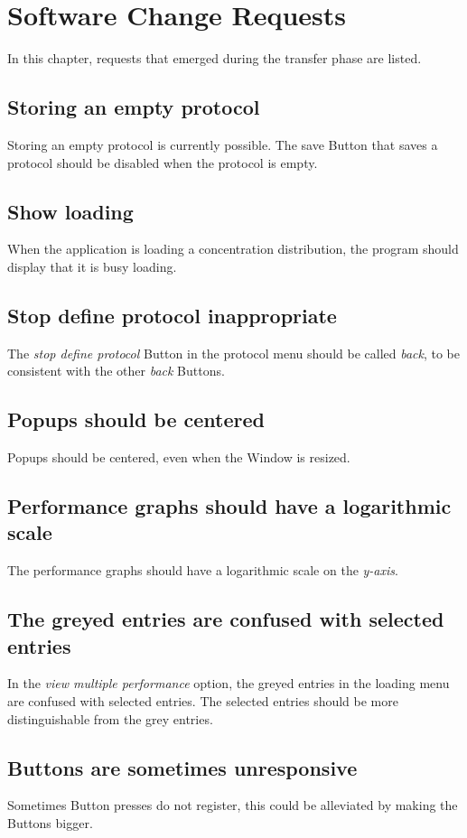 \chapter{Software Change Requests}
\label{chap:changes}

In this chapter, requests that emerged during the transfer phase are listed.

\section*{Storing an empty protocol}
Storing an empty protocol is currently possible. The save Button that saves a protocol should be disabled when the protocol is empty.

\section*{Show loading}
When the application is loading a concentration distribution, the program should display that it is busy loading.

\section*{Stop define protocol inappropriate}
The \emph{stop define protocol} Button in the protocol menu should be called \emph{back}, to be consistent with the other \emph{back} Buttons.

\section*{Popups should be centered}
Popups should be centered, even when the Window is resized.

\section*{Performance graphs should have a logarithmic scale}
The performance graphs should have a logarithmic scale on the \emph{y-axis}.

\section*{The greyed entries are confused with selected entries}
In the \emph{view multiple performance} option, the greyed entries in the loading menu are confused with selected entries. The selected entries should be more distinguishable from the grey entries.

\section*{Buttons are sometimes unresponsive}
Sometimes Button presses do not register, this could be alleviated by making the Buttons bigger.


